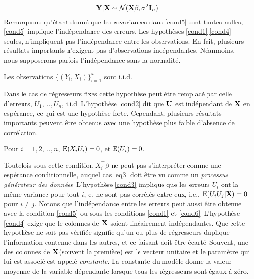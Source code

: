 \begin{align*}
\mathbf Y|\mathbf X \sim\mathcal{N}(\mathbf X\beta, \sigma^2\mathbf{I}_n)
\end{align*}
Remarquons qu'étant donné que les covariances dans \eqref{cond5} sont toutes nulles,  \eqref{cond5} implique l'indépendance des erreurs. Les hypothèses \eqref{cond1}-\eqref{cond4} seules, n'impliquent pas l'indépendance entre les observations. En fait, plusieurs résultats importants n'exigent pas d'observations indépendantes. Néanmoins, nous supposerons parfois l'indépendance  sans la normalité.
\begin{condition}
Les observations $\{(Y_i, X_i)\}_{i=1}^n$ sont i.i.d.
\label{cond6}
\end{condition}
Dans le cas de régresseurs fixes cette hypothèse peut être remplacé par celle d'erreurs, $U_1, ..., U_n$, i.i.d\
L'hypothèse \eqref{cond2} dit que $\mathbf U$ est indépendant de $\mathbf X$ en espérance, ce qui est une hypothèse forte. Cependant, plusieurs résultats importants peuvent être obtenus avec une hypothèse plus faible  d'absence de corrélation.
\begin{condition}
Pour $i=1,2,...,n$, $\operatorname{E}(X_iU_i)=0$, et $\operatorname{E}(U_i)=0$.
\label{cond7}
\end{condition}
Toutefois sous cette condition $X_i^\top\beta$ ne peut pas s'interpréter comme une espérance conditionnelle, auquel cas \eqref{eq3} doit être vu comme un \emph{processus générateur des données}\
L'hypothèse \eqref{cond3} implique que les erreurs $U_i$ ont la même variance pour tout $i$, et ne sont pas corrélés entre eux, i.e., $\operatorname{E}(U_iU_j| \mathbf X) = 0$ pour $i\neq j$. Notons que l'indépendance entre les erreurs peut aussi être obtenue avec la condition \eqref{cond5} ou sous les  conditions \eqref{cond1} et \eqref{cond6}\
L'hypothèse \eqref{cond4} exige que le colonnes de $\mathbf X$ soient linéairement indépendantes. Que cette hypothèse ne soit pas vérifiée signifie qu'un ou plus de régresseurs duplique l'information contenue dans les autres, et ce faisant doit être écarté\
Souvent, une des colonnes de $\mathbf X$(souvent la première) est le vecteur unitaire et le paramètre qui lui est associé est appelé \emph{constante}. La constante du modèle donne la valeur moyenne de la variable dépendante lorsque tous les régresseurs sont égaux à zéro.

